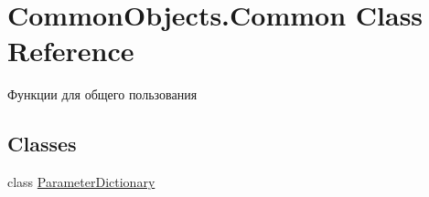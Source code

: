 \hypertarget{class_common_objects_1_1_common}{
\section{CommonObjects.Common Class Reference}
\label{class_common_objects_1_1_common}
}


Функции для общего пользования  


\subsection*{Classes}
\begin{DoxyCompactItemize}
\item 
class \hyperlink{class_common_objects_1_1_common_1_1_parameter_dictionary-g}{ParameterDictionary}
\end{DoxyCompactItemize}
